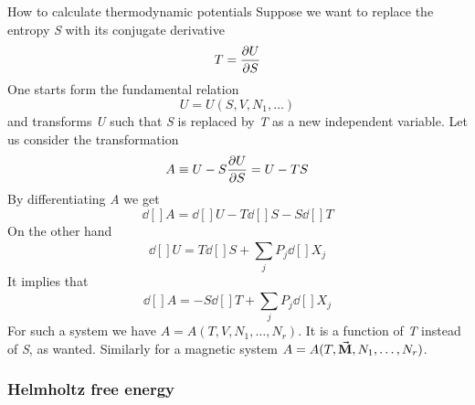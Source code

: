 \documentclass[../../Main/Main.tex]{subfiles}
\begin{document}
\begin{example}{How to calculate thermodynamic potentials}{}
Suppose we want to replace the entropy \emph{S} with its conjugate derivative
\begin{equation*}
  T = \pdv{U}{S}
\end{equation*}
One starts form the fundamental relation
\begin{equation*}
  U=U(S,V,N_1,\dots)
\end{equation*}
and transforms \emph{U} such that \emph{S} is replaced by \emph{T} as a new independent variable. Let us consider the transformation
\begin{equation*}
  A \equiv U - S \pdv{U}{S} = U- T S
\end{equation*}
By differentiating \emph{A} we get
\begin{equation*}
  \dd[]{A} = \dd[]{U} - T \dd[]{S}  - S \dd[]{T}
\end{equation*}
On the other hand
\begin{equation*}
  \dd[]{U} = T \dd[]{S} + \sum_{j}^{} P_j \dd[]{X_j}
\end{equation*}
It implies that
\begin{equation*}
  \dd[]{A} = - S \dd[]{T} + \sum_{j}^{} P_j \dd[]{X_j}
\end{equation*}
For such a system we have \( A=A(T,V,N_1,\dots,N_r) \). It is a function of \emph{T} instead of \emph{S}, as wanted.  Similarly for a magnetic system \( A=A(T,\va{M},N_1,\dots,N_r ) \).
\end{example}

\subsubsection{Helmholtz free energy}
\end{document}
